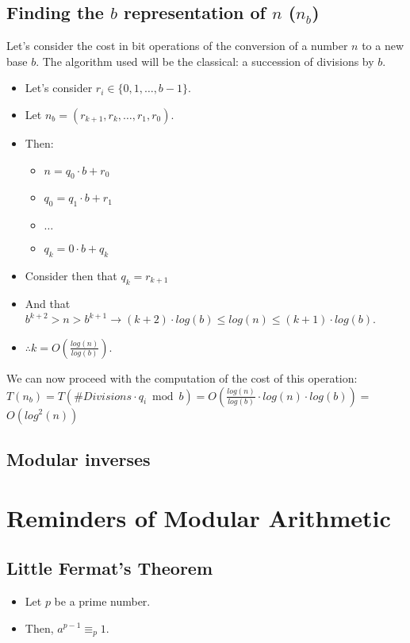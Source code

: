 \documentclass[12pt, a4paper, english]{report}
\begin{document}
\subsection{Finding the $b$ representation of $n$ ($n_{b}$)}
Let's consider the cost in bit operations of the conversion of a number $n$ to a new base $b$. \newline
The algorithm used will be the classical: a succession of divisions by $b$. \newline
\begin{itemize}
    \item Let's consider $r_{i} \in \{0, 1, \dots, b-1\}$.
    \item Let $n_{b} = (r_{k+1}, r_{k}, \dots, r_{1}, r_{0})$.
    \item Then: \begin{itemize}
                    \item $n = q_{0} \cdot b + r_{0}$
                    \item $q_{0} = q_{1} \cdot b + r_{1}$
                    \item $\dots$
                    \item $q_{k} = 0 \cdot b + q_{k}$
                \end{itemize}
    \item Consider then that $q_{k} = r_{k+1}$
    \item And that $b^{k+2} > n > b^{k+1} \rightarrow (k+2) \cdot log(b) \leq log(n) \leq (k+1) \cdot log(b)$.
    \item $\therefore k = O(\frac{log(n)}{log(b)})$.
\end{itemize}
We can now proceed with the computation of the cost of this operation: \newline
$T(n_{b}) = T(\#Divisions \cdot q_{i} \bmod b) = O(\frac{log(n)}{log(b)} \cdot log(n) \cdot log(b)) = $ \\
$O(log^{2}(n))$
\subsection{Modular inverses}


\section{Reminders of Modular Arithmetic}
\subsection{Little Fermat's Theorem}\label{little_fermat_th}
\begin{itemize}
    \item Let $p$ be a prime number.
    \item Then, $a^{p-1} \equiv_{p} 1$.
\end{itemize}
\end{document}
